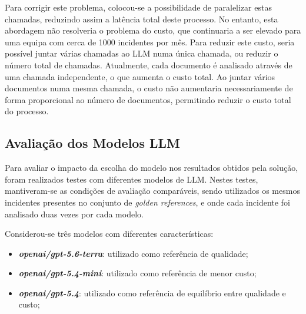 		Para corrigir este problema, colocou-se a possibilidade de paralelizar estas chamadas, reduzindo assim a latência total deste processo. No entanto, esta abordagem não resolveria o problema do custo, que continuaria a ser elevado para uma equipa com cerca de 1000 incidentes por mês. Para reduzir este custo, seria possível juntar várias chamadas ao \gls{LLM} numa única chamada, ou reduzir o número total de chamadas. Atualmente, cada documento é analisado através de uma chamada independente, o que aumenta o custo total. Ao juntar vários documentos numa mesma chamada, o custo não aumentaria necessariamente de forma proporcional ao número de documentos, permitindo reduzir o custo total do processo.
		
	\subsection{Avaliação dos Modelos LLM}
		
		
		
		
		
		Para avaliar o impacto da escolha do modelo nos resultados obtidos pela solução, foram realizados testes com diferentes modelos de \gls{LLM}. Nestes testes, mantiveram-se as condições de avaliação comparáveis, sendo utilizados os mesmos incidentes presentes no conjunto de \textit{golden references}, e onde cada incidente foi analisado duas vezes por cada modelo.
		
		Considerou-se três modelos com diferentes características:
		\begin{itemize}
			\item \textbf{\textit{openai/gpt-5.6-terra}}: utilizado como referência de qualidade;
			\item \textbf{\textit{openai/gpt-5.4-mini}}: utilizado como referência de menor custo;
			\item \textbf{\textit{openai/gpt-5.4}}: utilizado como referência de equilíbrio entre qualidade e custo;
	 	\end{itemize}
		
